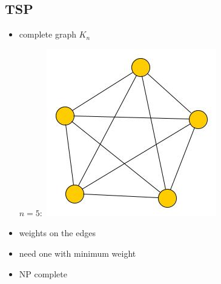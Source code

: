 \subsection{TSP}
\begin{itemize}
	\item complete graph $K_n$
	\begin{center}
		$n=5:$ \includegraphics[scale=0.5]{img/graph29}
	\end{center}
	\item weights on the edges
	\item need one with minimum weight
	\item NP complete
\end{itemize}
